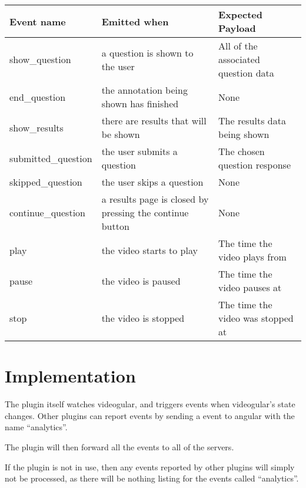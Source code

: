 \begin{tabular}{p{3.2cm} p{6cm} p{4cm}}

\textbf{Event name} & \textbf{Emitted when} & \textbf{Expected Payload} \\
\hline
show\_question & a question is shown to the user & All of the associated question data \\
\hline
end\_question & the annotation being shown has finished & None \\
\hline
show\_results & there are results that will be shown & The results data being shown \\
\hline
submitted\_question & the user submits a question & The chosen question response \\
\hline
skipped\_question & the user skips a question & None \\
\hline
continue\_question & a results page is closed by pressing the continue button & None \\
\hline
play & the video starts to play & The time the video plays from \\
\hline
pause & the video is paused & The time the video pauses at \\
\hline
stop & the video is stopped & The time the video was stopped at \\
\end{tabular}

\section{Implementation}

The plugin itself watches videogular, and triggers events when videogular's state changes. Other plugins can report events by sending a event to angular with the name ``analytics''.

The plugin will then forward all the events to all of the servers.

If the plugin is not in use, then any events reported by other plugins will simply not be processed, as there will be nothing listing for the events called ``analytics''.

